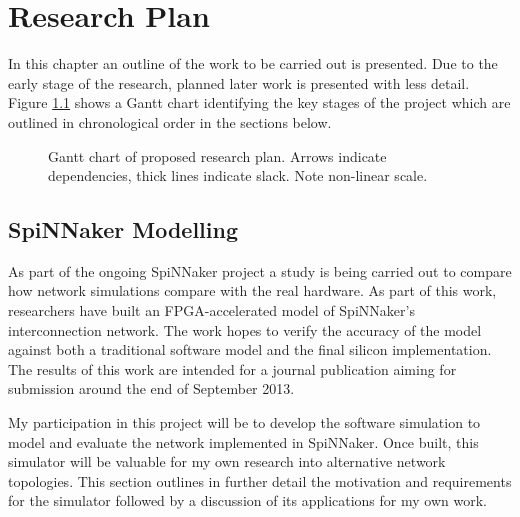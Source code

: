 \chapter{Research Plan}
	
	\label{sec:research-plan}
	
	In this chapter an outline of the work to be carried out is presented. Due to
	the early stage of the research, planned later work is presented with less
	detail.  Figure \ref{fig:plan-gantt} shows a Gantt chart identifying the key
	stages of the project which are outlined in chronological order in the
	sections below.
	
	\begin{figure}[b!]
		\center
		
		
		\caption[Research plan Gantt chart.]{Gantt chart of proposed research plan.
		Arrows indicate dependencies, thick lines indicate slack.  Note non-linear
		scale.}
		\label{fig:plan-gantt}
	\end{figure}
	
	
	\section{SpiNNaker Modelling}
		
		
		As part of the ongoing SpiNNaker project a study is being carried out to
		compare how network simulations compare with the real hardware. As part of
		this work, researchers have built an FPGA-accelerated model of SpiNNaker's
		interconnection network. The work hopes to verify the accuracy of the model
		against both a traditional software model and the final silicon
		implementation. The results of this work are intended for a journal
		publication aiming for submission around the end of September 2013.
		
		My participation in this project will be to develop the software simulation
		to model and evaluate the network implemented in SpiNNaker. Once built, this
		simulator will be valuable for my own research into alternative network
		topologies.  This section outlines in further detail the motivation and
		requirements for the simulator followed by a discussion of its applications
		for my own work.
		
